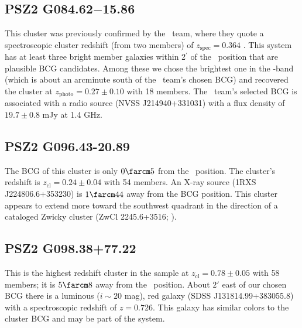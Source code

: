 \documentclass[apj, revtex4-1]{emulateapj}
\begin{document}
\subsection{PSZ2 G084.62$-$15.86} %
This cluster was previously confirmed by the \planck\ team, where they quote a spectroscopic cluster redshift (from two members) of $z_\mathrm{spec} = 0.364$ \citep{PlanckCollaboration2016a}. This system has at least three bright member galaxies within 2$^\prime$ of the \planck\ position that are plausible BCG candidates. Among these we chose the brightest one in the \sdssi-band (which is about an arcminute south of the \planck\ team's chosen BCG) and recovered the cluster at $z_\mathrm{photo} = 0.27 \pm 0.10$ with 18 members. The \planck\ team's selected BCG is associated with a radio source (NVSS J214940+331031) with a flux density of $19.7\pm 0.8$ mJy at 1.4 GHz.

\subsection{PSZ2 G096.43-20.89} %
The BCG of this cluster is only $0\farcm5$ from the \planck\ position. The cluster's redshift is $z_\mathrm{cl} = 0.24 \pm 0.04$ with 54 members. An X-ray source (1RXS J224806.6+353230) is $1\farcm44$ away from the BCG position. This cluster appears to extend more toward the southwest quadrant in the direction of a cataloged Zwicky cluster (ZwCl 2245.6+3516; \citealt{Zwicky1968}).

\subsection{PSZ2 G098.38+77.22} %
This is the highest redshift cluster in the sample at $z_\mathrm{cl} = 0.78 \pm 0.05$ with 58 members; it is $5\farcm8$ away from the \planck\ position. About $2'$ east of our chosen BCG there is a luminous ($i\sim 20$ mag), red galaxy (SDSS J131814.99+383055.8) with a spectroscopic redshift of $z=0.726$. This galaxy has similar colors to the cluster BCG and may be part of the system.
\end{document}
